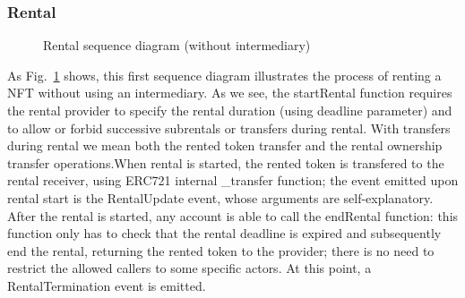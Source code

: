 \documentclass[english, LaM, oneside]{sapthesis}%
\begin{document}
\subsubsection{Rental}

\begin{figure}
    \centering
        \begin{adjustbox}{width=1\textwidth}
        \end{adjustbox}
    \caption{Rental sequence diagram (without intermediary)}
    \label{fig:Rental SD}
\end{figure}

As Fig.~\ref{fig:Rental SD} shows, this first sequence diagram illustrates the process of renting a NFT without using an intermediary. As we see, the startRental function requires the rental provider to specify the rental duration (using deadline parameter) and to allow or forbid successive subrentals or transfers during rental. With transfers during rental we mean both the rented token transfer and the rental ownership transfer operations.\newline When rental is started, the rented token is transfered to the rental receiver, using ERC721 internal \_transfer function; the event emitted upon rental start is the RentalUpdate event, whose arguments are self-explanatory.\newline
After the rental is started, any account is able to call the endRental function: this function only has to check that the rental deadline is expired and subsequently end the rental, returning the rented token to the provider; there is no need to restrict the allowed callers to some specific actors. At this point, a RentalTermination event is emitted.
\end{document}
